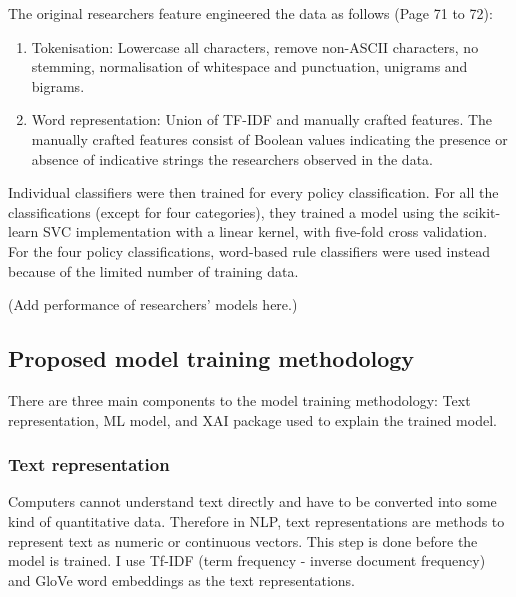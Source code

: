 The original researchers feature engineered the data as follows (Page 71 to 72): 

\begin{enumerate}
	\item Tokenisation: Lowercase all characters, remove non-ASCII characters, no stemming, normalisation of whitespace and punctuation, unigrams and bigrams.
	\item Word representation: Union of TF-IDF and manually crafted features. The manually crafted features consist of Boolean values indicating the presence or absence of indicative strings the researchers observed in the data.
\end{enumerate}

Individual classifiers were then trained for every policy classification. For all the classifications (except for four categories), they trained a model using the scikit-learn SVC implementation with a linear kernel, with five-fold cross validation. For the four policy classifications, word-based rule classifiers were used instead because of the limited number of training data.

(Add performance of researchers' models here.)



\subsection{Proposed model training methodology}

There are three main components to the model training methodology: Text representation, ML model, and XAI package used to explain the trained model.


\subsubsection{Text representation}

Computers cannot understand text directly and have to be converted into some kind of quantitative data. Therefore in NLP, text representations are methods to represent text as numeric or continuous vectors. This step is done before the model is trained. I use Tf-IDF (term frequency - inverse document frequency) and GloVe word embeddings as the text representations.

